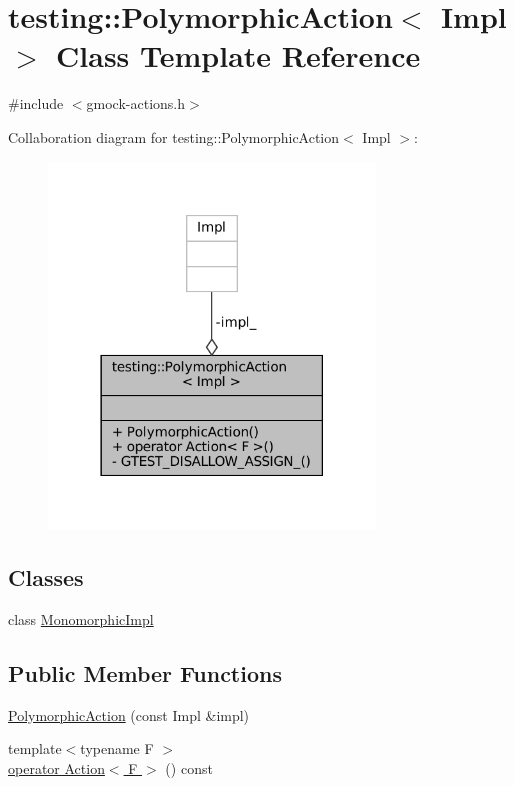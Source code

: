 \hypertarget{classtesting_1_1PolymorphicAction}{}\section{testing\+:\+:Polymorphic\+Action$<$ Impl $>$ Class Template Reference}
\label{classtesting_1_1PolymorphicAction}


{\ttfamily \#include $<$gmock-\/actions.\+h$>$}



Collaboration diagram for testing\+:\+:Polymorphic\+Action$<$ Impl $>$\+:
\nopagebreak
\begin{figure}[H]
\begin{center}
\leavevmode
\includegraphics[width=246pt]{classtesting_1_1PolymorphicAction__coll__graph}
\end{center}
\end{figure}
\subsection*{Classes}
\begin{DoxyCompactItemize}
\item 
class \hyperlink{classtesting_1_1PolymorphicAction_1_1MonomorphicImpl}{Monomorphic\+Impl}
\end{DoxyCompactItemize}
\subsection*{Public Member Functions}
\begin{DoxyCompactItemize}
\item 
\hyperlink{classtesting_1_1PolymorphicAction_a062e5a45ad61dcf8085b15cc882ca0ae}{Polymorphic\+Action} (const Impl \&impl)
\item 
{\footnotesize template$<$typename F $>$ }\\\hyperlink{classtesting_1_1PolymorphicAction_ac35461616cc15c06f1a2f9ee1c03fb8f}{operator Action$<$ F $>$} () const
\end{DoxyCompactItemize}
